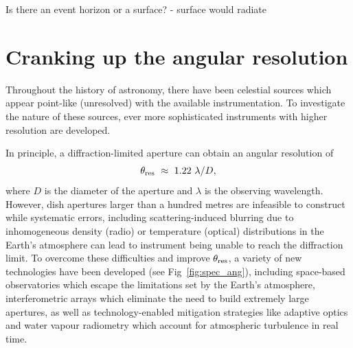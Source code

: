 Is there an event horizon or a surface? - surface would radiate


\section{Cranking up the angular resolution}
Throughout the history of astronomy, there have been celestial sources which appear point-like (unresolved) with the available instrumentation. To investigate the nature of these sources, ever more sophisticated instruments with higher resolution are developed. 

In principle, a diffraction-limited aperture can obtain an angular resolution of
\begin{equation}\label{eq:ang_res}
 \theta_{\rm res}\ \approx \ 1.22\ \lambda / D,
\end{equation}
where $D$ is the diameter of the aperture and $\lambda$ is the observing wavelength. However, dish apertures larger than a hundred metres are infeasible to construct while systematic errors, including scattering-induced blurring due to inhomogeneous density (radio) or temperature (optical) distributions in the Earth's atmosphere can lead to instrument being unable to reach the diffraction limit. To overcome these difficulties and improve $\theta_{\rm res}$, a variety of new technologies have been developed (see Fig~\ref{fig:spec_ang}), including space-based observatories which escape the limitations set by the Earth's atmosphere, interferometric arrays which eliminate the need to build extremely large apertures, as well as technology-enabled mitigation strategies like adaptive optics and water vapour radiometry which account for atmospheric turbulence in real time. 


